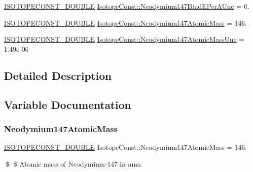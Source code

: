 \begin{DoxyCompactItemize}
\mbox{\hyperlink{group___isotope_const-_macros_ga8f45a7272ce02c0b4c65c44636ed719a}{I\+S\+O\+T\+O\+P\+E\+C\+O\+N\+S\+T\+\_\+\+D\+O\+U\+B\+LE}} \mbox{\hyperlink{group___isotope_const-_neodymium-_nd147_ga49a2f3bf29c74891c309f1550de5f925}{Isotope\+Const\+::\+Neodymium147\+Bind\+E\+Per\+A\+Unc}} = 0.
\item 
\mbox{\hyperlink{group___isotope_const-_macros_ga8f45a7272ce02c0b4c65c44636ed719a}{I\+S\+O\+T\+O\+P\+E\+C\+O\+N\+S\+T\+\_\+\+D\+O\+U\+B\+LE}} \mbox{\hyperlink{group___isotope_const-_neodymium-_nd147_ga14ae3acdcef7e617a2dbd4639975a105}{Isotope\+Const\+::\+Neodymium147\+Atomic\+Mass}} = 146.
\item 
\mbox{\hyperlink{group___isotope_const-_macros_ga8f45a7272ce02c0b4c65c44636ed719a}{I\+S\+O\+T\+O\+P\+E\+C\+O\+N\+S\+T\+\_\+\+D\+O\+U\+B\+LE}} \mbox{\hyperlink{group___isotope_const-_neodymium-_nd147_ga53a9ff8d158b0578749f2d299e93e39f}{Isotope\+Const\+::\+Neodymium147\+Atomic\+Mass\+Unc}} = 1.\+49e-\/06
\end{DoxyCompactItemize}


\subsection{Detailed Description}


\subsection{Variable Documentation}
\mbox{\label{group___isotope_const-_neodymium-_nd147_ga14ae3acdcef7e617a2dbd4639975a105}} 
\subsubsection{\texorpdfstring{Neodymium147\+Atomic\+Mass}{Neodymium147AtomicMass}}
{\footnotesize\ttfamily \mbox{\hyperlink{group___isotope_const-_macros_ga8f45a7272ce02c0b4c65c44636ed719a}{I\+S\+O\+T\+O\+P\+E\+C\+O\+N\+S\+T\+\_\+\+D\+O\+U\+B\+LE}} Isotope\+Const\+::\+Neodymium147\+Atomic\+Mass = 146.}

\$ \$ Atomic mass of Neodymium-\/147 in amu. \mbox{\label{group___isotope_const-_neodymium-_nd147_ga53a9ff8d158b0578749f2d299e93e39f}} 
